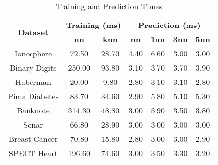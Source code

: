 \begin{table}[htbp]
\caption{Training and Prediction Times}
\begin{center}
\begin{tabular}{|c|c|c|c|c|c|c|}
\hline
\multirow{2}{*}{\textbf{Dataset}} & \multicolumn{2}{c|}{\textbf{Training (ms)}} & \multicolumn{4}{c|}{\textbf{Prediction (ms)}} \\ \cline{2-7}
 & \textbf{nn} & \textbf{knn} & \textbf{nn} & \textbf{1nn} & \textbf{3nn} & \textbf{5nn} \\ \hline
Ionosphere & 72.50 & 28.70 & 4.40 & 6.60 & 3.00 & 3.00 \\ \hline
Binary Digits & 250.00 & 93.80 & 3.10 & 3.70 & 3.70 & 3.90 \\ \hline
Haberman & 20.00 & 9.80 & 2.80 & 3.10 & 3.10 & 2.80 \\ \hline
Pima Diabetes & 83.70 & 34.60 & 2.90 & 5.80 & 5.10 & 5.30 \\ \hline
Banknote & 314.30 & 48.80 & 3.00 & 3.90 & 3.50 & 3.80 \\ \hline
Sonar & 66.80 & 28.90 & 3.00 & 3.00 & 3.00 & 3.00 \\ \hline
Breast Cancer & 70.80 & 15.80 & 2.80 & 3.00 & 3.00 & 2.90 \\ \hline
SPECT Heart & 196.60 & 74.60 & 3.00 & 3.50 & 3.30 & 3.20 \\ \hline
\end{tabular}
\label{tab:timing}
\end{center}
\end{table}